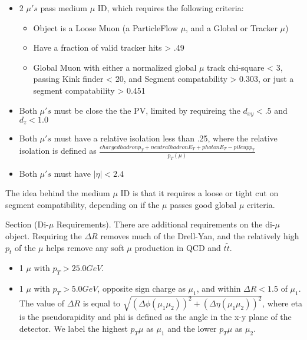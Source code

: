 \begin{itemize}
  \item 2 $\mu's$ pass medium $\mu$ ID, which requires the following criteria:
  \begin{itemize}  
    \item Object is a Loose Muon (a ParticleFlow $\mu$, and a Global or Tracker $\mu$)
    \item Have a fraction of valid tracker hits > .49
    \item Global Muon with either a normalized global $\mu$ track chi-square < 3, passing Kink finder < 20, and Segment compatability > 0.303, or just a segment compatability > 0.451 %
  \end{itemize}
  \item Both $\mu's$ must be close the the PV, limited by requireing the $d_{xy} < .5$ and $d_{z} < 1.0$
  \item Both $\mu's$ must have a relative isolation less than .25, where the relative isolation is defined as $\frac{charged hadron p_{T} + neutral hadron E_{T} + photon E_{T} - pileup p_{T}}{p_{T}(\mu)}$
  \item Both $\mu's$ must have $|\eta| < 2.4$
\end{itemize}

The idea behind the medium $\mu$ ID is that it requires a loose or tight cut on segment compatibility, depending on if the $\mu$ passes good global $\mu$ criteria. %




Section (Di-$\mu$ Requirements). There are additional requirements on the di-$\mu$ object. Requiring the $\Delta R$ removes much of the Drell-Yan, and the relatively high $p_{t}$ of the $\mu$ helps remove any soft $\mu$ production in QCD and $t\tilde{t}$.

\begin{itemize}
  \item 1 $\mu$ with $p_{T} > 25.0 GeV$.
  \item 1 $\mu$ with $p_{T} > 5.0 GeV$, opposite sign charge as $\mu_{1}$, and within $\Delta R < 1.5$ of $\mu_{1}$. The value of $\Delta R$ is equal to $\sqrt{(\Delta\phi(\mu_{1}\mu_{2}))^{2} + (\Delta\eta(\mu_{1}\mu_{2}))^{2} }$, where eta is the pseudorapidity and phi is defined as the angle in the x-y plane of the detector. We label the highest $p_{T} \mu$ as $\mu_{1}$ and the lower $p_{T} \mu$ as $\mu_{2}$.
\end{itemize}

